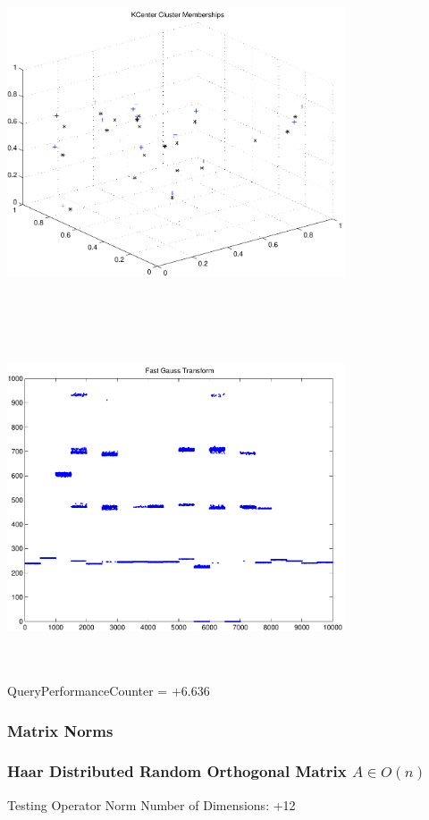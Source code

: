 \documentclass[9pt]{article}
\theoremstyle{plain}
\theoremstyle{definition}
\theoremstyle{remark}
\numberwithin{equation}{section}
\begin{document}
\includegraphics[width=10.0cm,height=10.0cm]{KCenterClusterMemberships_20_Centers.pdf}

\includegraphics[width=10.0cm,height=10.0cm]{FGT20_Centers.pdf}

QueryPerformanceCounter  =  +6.636
\subsubsection{Matrix Norms}
\subsubsection{Haar Distributed Random Orthogonal Matrix $A \in O(n)$}
 Testing Operator Norm
Number of Dimensions: +12
\end{document}
